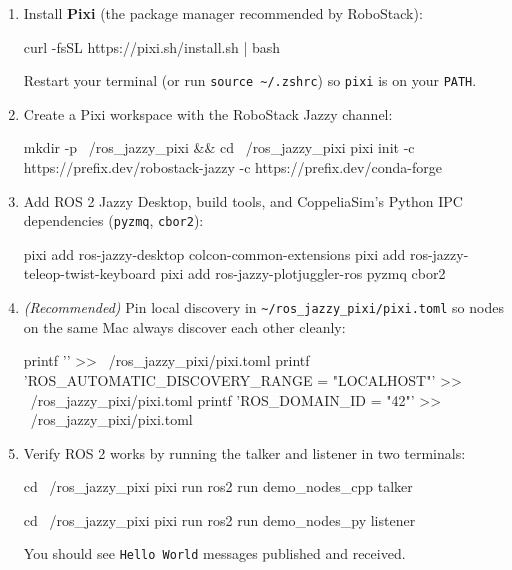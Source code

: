 \documentclass[11pt,a4paper]{article}
\begin{document}
\begin{enumerate}[leftmargin=1.5em]
  \item Install \textbf{Pixi} (the package manager recommended by RoboStack):
\begin{cmdbox}
curl -fsSL https://pixi.sh/install.sh | bash
\end{cmdbox}
  Restart your terminal (or run \texttt{source \textasciitilde/.zshrc}) so \texttt{pixi} is on your \texttt{PATH}.

  \item Create a Pixi workspace with the RoboStack Jazzy channel:
\begin{cmdbox}
mkdir -p ~/ros_jazzy_pixi && cd ~/ros_jazzy_pixi
pixi init -c https://prefix.dev/robostack-jazzy -c https://prefix.dev/conda-forge
\end{cmdbox}

  \item Add ROS 2 Jazzy Desktop, build tools, and CoppeliaSim's Python IPC dependencies (\texttt{pyzmq}, \texttt{cbor2}):
\begin{cmdbox}
pixi add ros-jazzy-desktop colcon-common-extensions
pixi add ros-jazzy-teleop-twist-keyboard
pixi add ros-jazzy-plotjuggler-ros pyzmq cbor2
\end{cmdbox}

  \item \textit{(Recommended)} Pin local discovery in \texttt{\textasciitilde/ros\_jazzy\_pixi/pixi.toml} so nodes on the same Mac always discover each other cleanly:
\begin{cmdbox}
printf '\n' >> ~/ros_jazzy_pixi/pixi.toml
printf 'ROS_AUTOMATIC_DISCOVERY_RANGE = "LOCALHOST"\n' >> ~/ros_jazzy_pixi/pixi.toml
printf 'ROS_DOMAIN_ID = "42"\n' >> ~/ros_jazzy_pixi/pixi.toml
\end{cmdbox}

  \item Verify ROS 2 works by running the talker and listener in two terminals:
\begin{cmdbox}
cd ~/ros_jazzy_pixi
pixi run ros2 run demo_nodes_cpp talker
\end{cmdbox}
\begin{cmdbox}
cd ~/ros_jazzy_pixi
pixi run ros2 run demo_nodes_py listener
\end{cmdbox}
  You should see \texttt{Hello World} messages published and received.
\end{enumerate}

\end{document}

